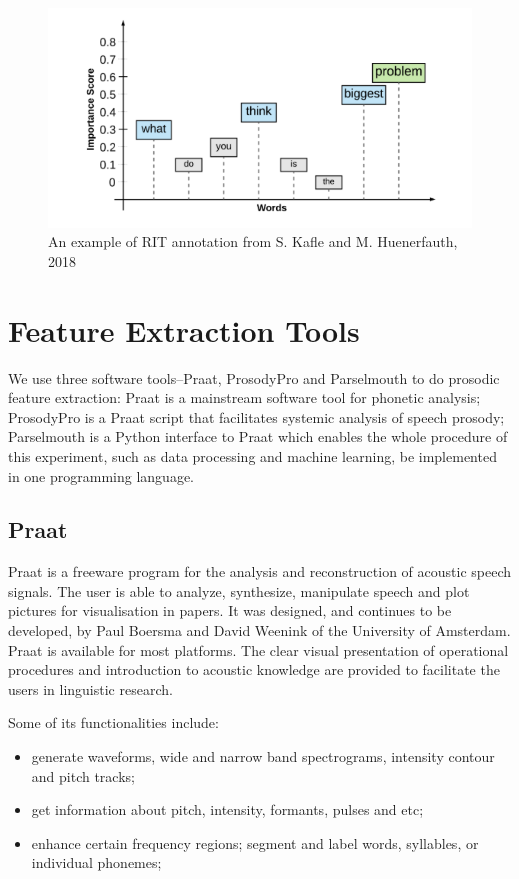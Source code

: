 \begin{figure}[ht]
	\includegraphics[width=15cm]{figures/word.png}
	\caption{An example of RIT annotation from S. Kafle and M. Huenerfauth, 2018}
	\label{fig:word}
\end{figure}

\section{Feature Extraction Tools} 
We use three software tools--Praat, ProsodyPro and Parselmouth to do prosodic feature extraction: Praat is a mainstream software tool for phonetic analysis; ProsodyPro is a Praat script that facilitates systemic analysis of speech prosody; Parselmouth is a Python interface to Praat which enables the whole procedure of this experiment, such as data processing and machine learning, be implemented in one programming language.
 
\subsection{ Praat}
Praat \citep{PaulBoersma&DavidWeenink2018} is a freeware program for the analysis and reconstruction of acoustic speech signals. The user is able to analyze, synthesize, manipulate speech and plot pictures for visualisation in papers. It was designed, and continues to be developed, by Paul Boersma and David Weenink of the University of Amsterdam. Praat is available for most platforms. The clear visual presentation of operational procedures and introduction to acoustic knowledge are provided to facilitate the users in linguistic research.

Some of its functionalities include:
\begin{itemize}
    \item generate waveforms, wide and narrow band spectrograms, intensity contour and pitch tracks;
    \item get information about pitch, intensity, formants, pulses and etc;
    \item enhance certain frequency regions; segment and label words, syllables, or individual phonemes;
\end{itemize}

